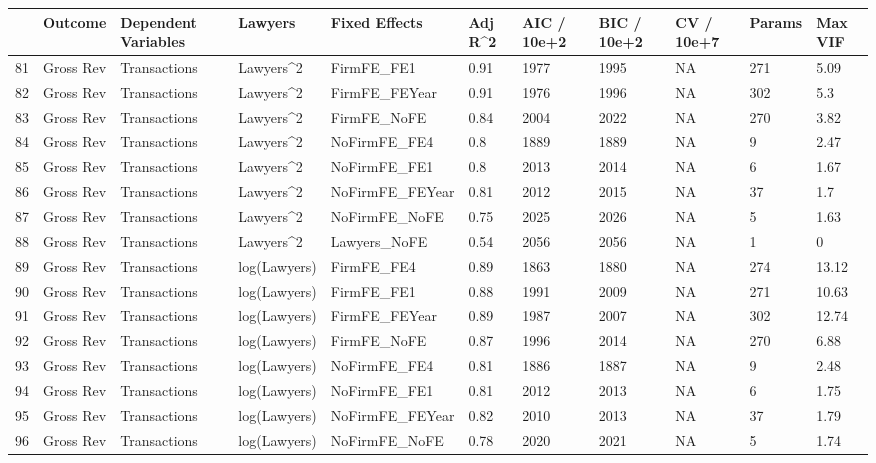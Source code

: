 \documentclass{article}
\begin{document}
\begin{table}[H]
\centering
\begin{tabular}{rllllllllll}
  \hline
 & Outcome & Dependent Variables & Lawyers & Fixed Effects & Adj R^2 & AIC / 10e+2 & BIC / 10e+2 & CV / 10e+7 & Params & Max VIF \\
  \hline
81 & Gross Rev & Transactions & Lawyers^2 & FirmFE\_FE1 & 0.91 & 1977 & 1995 & NA & 271 & 5.09 \\
  82 & Gross Rev & Transactions & Lawyers^2 & FirmFE\_FEYear & 0.91 & 1976 & 1996 & NA & 302 & 5.3 \\
  83 & Gross Rev & Transactions & Lawyers^2 & FirmFE\_NoFE & 0.84 & 2004 & 2022 & NA & 270 & 3.82 \\
  84 & Gross Rev & Transactions & Lawyers^2 & NoFirmFE\_FE4 & 0.8 & 1889 & 1889 & NA & 9 & 2.47 \\
  85 & Gross Rev & Transactions & Lawyers^2 & NoFirmFE\_FE1 & 0.8 & 2013 & 2014 & NA & 6 & 1.67 \\
  86 & Gross Rev & Transactions & Lawyers^2 & NoFirmFE\_FEYear & 0.81 & 2012 & 2015 & NA & 37 & 1.7 \\
  87 & Gross Rev & Transactions & Lawyers^2 & NoFirmFE\_NoFE & 0.75 & 2025 & 2026 & NA & 5 & 1.63 \\
  88 & Gross Rev & Transactions & Lawyers^2 & Lawyers\_NoFE & 0.54 & 2056 & 2056 & NA & 1 & 0 \\
  89 & Gross Rev & Transactions & log(Lawyers) & FirmFE\_FE4 & 0.89 & 1863 & 1880 & NA & 274 & 13.12 \\
  90 & Gross Rev & Transactions & log(Lawyers) & FirmFE\_FE1 & 0.88 & 1991 & 2009 & NA & 271 & 10.63 \\
  91 & Gross Rev & Transactions & log(Lawyers) & FirmFE\_FEYear & 0.89 & 1987 & 2007 & NA & 302 & 12.74 \\
  92 & Gross Rev & Transactions & log(Lawyers) & FirmFE\_NoFE & 0.87 & 1996 & 2014 & NA & 270 & 6.88 \\
  93 & Gross Rev & Transactions & log(Lawyers) & NoFirmFE\_FE4 & 0.81 & 1886 & 1887 & NA & 9 & 2.48 \\
  94 & Gross Rev & Transactions & log(Lawyers) & NoFirmFE\_FE1 & 0.81 & 2012 & 2013 & NA & 6 & 1.75 \\
  95 & Gross Rev & Transactions & log(Lawyers) & NoFirmFE\_FEYear & 0.82 & 2010 & 2013 & NA & 37 & 1.79 \\
  96 & Gross Rev & Transactions & log(Lawyers) & NoFirmFE\_NoFE & 0.78 & 2020 & 2021 & NA & 5 & 1.74 \\

\end{tabular}
\end{table}
\end{document}
